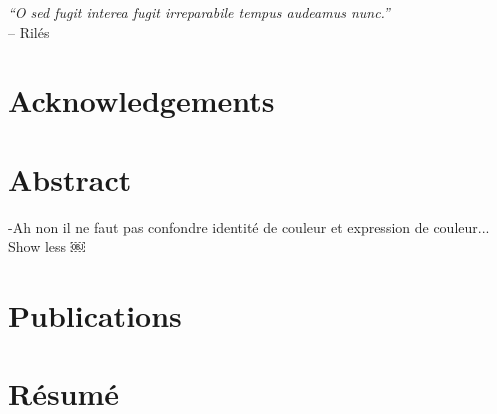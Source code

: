 \documentclass[a4paper,11pt,twoside]{style}
\begin{document}


\dominitoc


\cleardoublepage

 \begin{flushright}
\textit{``O sed fugit interea fugit irreparabile tempus audeamus nunc.''}\\
-- Ril\'es
\end{flushright}
\cleardoublepage

\cleardoublepage

\section*{Acknowledgements}

\begin{vcenterpage}
\end{vcenterpage}%

\cleardoublepage

\section*{Abstract}

\begin{vcenterpage}
\end{vcenterpage}
-Ah non il ne faut pas confondre identité de couleur et expression de couleur...
Show less
￼

\cleardoublepage

\section*{Publications}

	
\cleardoublepage

\section*{R\'esum\'e}


\cleardoublepage

\tableofcontents
{}
\mtcaddchapter
\listoffigures
{}
\mtcaddchapter
\listoftables

\mainmatter










\appendix



\end{document}
